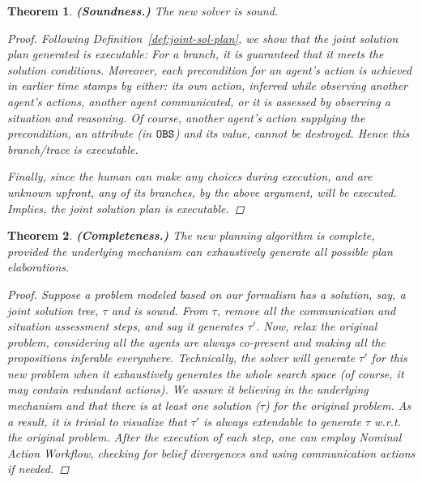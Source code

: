 \documentclass[letterpaper]{article} %
\newtheorem{theorem}{Theorem}[section]
\begin{document}
\begin{theorem}
\textbf{(Soundness.)} The new solver is sound.
\vspace{-0.06in}
\begin{proof}
Following Definition~\ref{def:joint-sol-plan},
we show that the joint solution plan generated is executable:
For a branch, it is guaranteed that it meets the {\em solution conditions}.
Moreover, each precondition for an agent's action is achieved in earlier time stamps by either: its own action, 
\textit{inferred} while observing another agent's actions, 
another agent \textit{communicated},
or it is \textit{assessed} by observing a situation and reasoning.
Of course, another agent’s action supplying the precondition, an attribute (in $\texttt{OBS}$) and its value, cannot be destroyed. 
Hence this branch/trace is executable.

Finally, since the human can make any choices during execution,
and are unknown upfront, any of its branches, by the
above argument, will be executed. 
Implies, the joint solution plan is executable.
\end{proof}
\end{theorem}

\begin{theorem}
\textbf{(Completeness.)} The new planning algorithm is complete, provided the underlying mechanism can exhaustively generate all possible plan elaborations. 
\vspace{-0.06in}
\begin{proof}
Suppose a problem modeled based on our formalism has a solution, say, a joint solution tree, $\tau$ and is sound. 
From $\tau$, remove all the communication and situation assessment steps, and say it generates $\tau'$. Now, relax the original problem, considering all the agents are always co-present and making all the propositions \textit{inferable} everywhere. 
Technically, the solver will generate $\tau'$ for this new problem when it exhaustively generates the whole search space (of course, it may contain redundant actions). 
We assure it believing in the underlying mechanism and that there is at least one solution ($\tau$) for the original problem. As a result, it is trivial to visualize that $\tau'$ is always extendable to generate $\tau$ w.r.t. the original problem. 
After the execution of each step, one can employ \textit{Nominal Action Workflow}, checking for belief divergences and using communication actions if needed. 
\end{proof}
\end{theorem}
\end{document}
